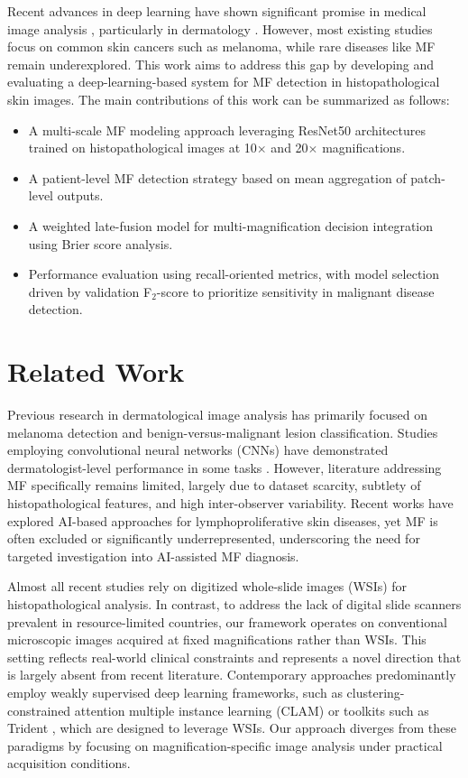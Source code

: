 \documentclass[runningheads]{llncs}
\begin{document}
Recent advances in deep learning have shown significant promise in medical image analysis \cite{litjens2017deep}, particularly in dermatology \cite{esteva2017dermatologist}. However, most existing studies focus on common skin cancers such as melanoma, while rare diseases like MF remain underexplored. This work aims to address this gap by developing and evaluating a deep-learning-based system for MF detection in histopathological skin images. The main contributions of this work can be summarized as follows:
\begin{itemize}
    \item A multi-scale MF modeling approach leveraging ResNet50 architectures trained on histopathological images at 10$\times$ and 20$\times$ magnifications.
    \item A patient-level MF detection strategy based on mean aggregation of patch-level outputs.
    \item A weighted late-fusion model for multi-magnification decision integration using Brier score analysis.
    \item Performance evaluation using recall-oriented metrics, with model selection driven by validation F$_2$-score to prioritize sensitivity in malignant disease detection.
\end{itemize}

\section{Related Work}
Previous research in dermatological image analysis has primarily focused on melanoma detection and benign-versus-malignant lesion classification. Studies employing convolutional neural networks (CNNs) have demonstrated dermatologist-level performance in some tasks \cite{Doeleman2024-MF}. However, literature addressing MF specifically remains limited, largely due to dataset scarcity, subtlety of histopathological features, and high inter-observer variability. Recent works have explored AI-based approaches for lymphoproliferative skin diseases, yet MF is often excluded or significantly underrepresented, underscoring the need for targeted investigation into AI-assisted MF diagnosis.

Almost all recent studies rely on digitized whole-slide images (WSIs) for histopathological analysis. In contrast, to address the lack of digital slide scanners prevalent in resource-limited countries, our framework operates on conventional microscopic images acquired at fixed magnifications rather than WSIs. This setting reflects real-world clinical constraints and represents a novel direction that is largely absent from recent literature. Contemporary approaches predominantly employ weakly supervised deep learning frameworks, such as clustering-constrained attention multiple instance learning (CLAM) \cite{Lu2021} or toolkits such as Trident \cite{zhang2025standardizing, vaidya2025molecular}, which are designed to leverage WSIs. Our approach diverges from these paradigms by focusing on magnification-specific image analysis under practical acquisition conditions.
\end{document}
